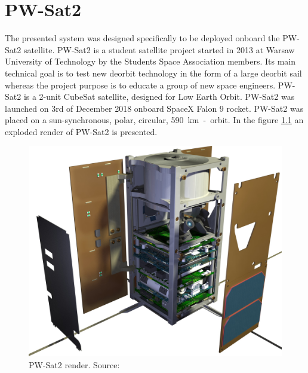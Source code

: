 \chapter{PW-Sat2}
The presented system was designed specifically to be deployed onboard the PW-Sat2 satellite. PW-Sat2 is a student satellite project started in 2013 at Warsaw University of Technology by the Students Space Association members. Its main technical goal is to test new deorbit technology in the form of a large deorbit sail whereas the project purpose is to educate a group of new space engineers. PW-Sat2 is a 2-unit CubeSat satellite, designed for Low Earth Orbit. PW-Sat2 was launched on 3rd of December 2018 onboard SpaceX Falon 9 rocket. PW-Sat2 was placed on a sun-synchronous, polar, circular, \SI{590}{\kilo\meter}~-~orbit.
In the figure \ref{PW-Sat_render_01} an exploded render of PW-Sat2 is presented.
\begin{figure}[H]
    \centering
    \includegraphics[width=0.65\paperwidth]{img/3/PW-Sat2_render_01.jpg}
    \caption{PW-Sat2 render. Source: \cite{PW_sat2_photo}}
    \label{PW-Sat_render_01}
\end{figure}


